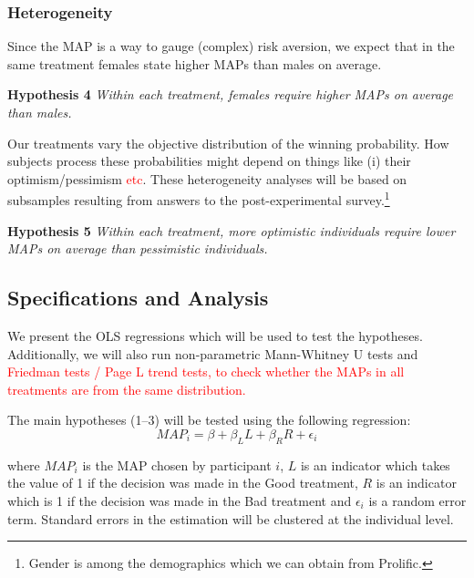 \subsubsection{Heterogeneity}
Since the MAP is a way to gauge (complex) risk aversion, we expect that in the same treatment females state higher MAPs than males on average.

\noindent \textbf{Hypothesis 4} \quad \textit{Within each treatment, females require higher MAPs on average than males.}

Our treatments vary the objective distribution of the winning probability.
How subjects process these probabilities might depend on things like (i) their optimism/pessimism \textcolor{red}{etc}.
These heterogeneity analyses will be based on subsamples resulting from answers to the post-experimental survey.\footnote{
Gender is among the demographics which we can obtain from Prolific.
}

\noindent \textbf{Hypothesis 5} \quad \textit{Within each treatment, more optimistic individuals require lower MAPs on average than pessimistic individuals.}




\subsection{Specifications and Analysis}
We present the OLS regressions which will be used to test the hypotheses.
Additionally, we will also run non-parametric Mann-Whitney U tests and \textcolor{red}{Friedman tests / Page L trend tests, to check whether the MAPs in all treatments are from the same distribution.}

The main hypotheses (1--3) will be tested using the following regression:
\begin{equation} \label{eq:1}
MAP_i = \beta + \beta_L L + \beta_R R + \epsilon_i
\end{equation}

\noindent where $MAP_i$ is the MAP chosen by participant $i$, $L$ is an indicator which takes the value of 1 if the decision was made in the Good treatment, $R$ is an indicator which is 1 if the decision was made in the Bad treatment and $\epsilon_i$ is a random error term.
Standard errors in the estimation will be clustered at the individual level.

